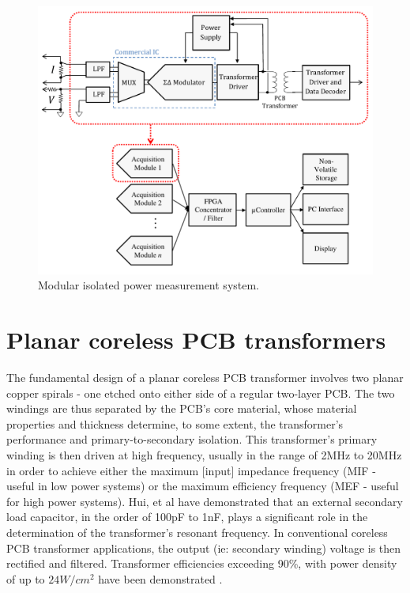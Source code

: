\documentclass[conference]{IEEEtran}
\begin{document}
\begin{figure}[t]
	\centering
	\includegraphics[width=1\columnwidth]{./img/FullSystem_BasicCol}
	\caption{Modular isolated power measurement system.}
	\label{fig:FullSystem}
\end{figure}

\section{Planar coreless PCB transformers}

The fundamental design of a planar coreless PCB transformer involves two planar copper spirals - one etched onto either side of a regular two-layer PCB.  The two windings are thus separated by the PCB's core material, whose material properties and thickness determine, to some extent, the transformer's performance and primary-to-secondary isolation.  This transformer's primary winding is then driven at high frequency, usually in the range of 2MHz to 20MHz in order to achieve either the maximum [input] impedance frequency (MIF - useful in low power systems) or the maximum efficiency frequency (MEF - useful for high power systems).  Hui, et al \cite{TangHuiFundamental} have demonstrated that an external secondary load capacitor, in the order of 100pF to 1nF, plays a significant role in the determination of the transformer's resonant frequency.  In conventional coreless PCB transformer applications, the output (ie: secondary winding) voltage is then rectified and filtered.  Transformer efficiencies exceeding 90\%, with power density of up to $ 24W/cm^{2} $ have been demonstrated \cite{TangHuiFundamental}.
\end{document}
